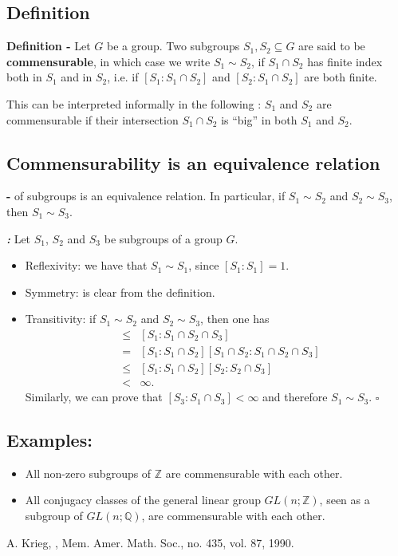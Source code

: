 \documentclass[12pt]{article}
\begin{document}
\subsection{Definition}

{\bf Definition -} Let $G$ be a group. Two subgroups $S_1, S_2 \subseteq G$ are said to be {\bf commensurable}, in which case we write $S_1 \sim S_2$, if $S_1 \cap S_2$ has finite index both in $S_1$ and in $S_2$, i.e. if $[S_1 : S_1 \cap S_2]$ and $[S_2 : S_1 \cap S_2]$ are both finite.


This  can be interpreted informally in the following : $S_1$ and $S_2$ are commensurable if their intersection $S_1 \cap S_2$ is ``big'' in both $S_1$ and $S_2$.

\subsection{Commensurability is an equivalence relation}

{\bf {} -}  of subgroups is an equivalence relation. In particular, if $S_1 \sim S_2$ and $S_2 \sim S_3$, then $S_1 \sim S_3$.

{\bf \emph{:}} Let $S_1$, $S_2$ and $S_3$ be subgroups of a group $G$.
\begin{itemize}
\item Reflexivity: we have that $S_1 \sim S_1$, since $[S_1: S_1] = 1$.
\item Symmetry: is clear from the definition.
\item Transitivity: if $S_1 \sim S_2$ and $S_2 \sim S_3$, then one has
\begin{eqnarray*}
[S_1:S_1 \cap S_3] & \leq & [S_1:S_1 \cap S_2 \cap S_3]\\
& = & [S_1:S_1 \cap S_2][S_1 \cap S_2 : S_1 \cap S_2 \cap S_3]\\
& \leq & [S_1:S_1 \cap S_2][S_2:S_2 \cap S_3]\\
& < & \infty.
\end{eqnarray*}
Similarly, we can prove that $[S_3:S_1 \cap S_3] < \infty$ and therefore $S_1 \sim S_3$. $\square$
\end{itemize}

\subsection{Examples:}
\begin{itemize}
\item All non-zero subgroups of $\mathbb{Z}$ are commensurable with each other.
\item All conjugacy classes of the general linear group $GL(n;\mathbb{Z})$, seen as a subgroup of $GL(n;\mathbb{Q})$, are commensurable with each other.
\end{itemize}

\begin{thebibliography}{9}
 A. Krieg, \emph{}, Mem. Amer. Math. Soc., no. 435, vol. 87, 1990.
\end{thebibliography}


\end{document}
